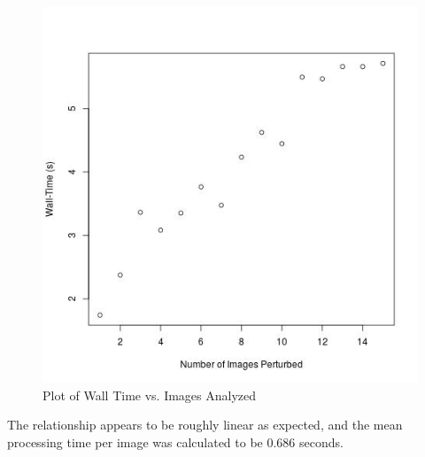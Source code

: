 \documentclass{article}
\begin{document}
\begin{figure}[H]
\centering
\includegraphics[scale = 0.7]{WallTimeConstant.jpg}
    \caption{Plot of Wall Time vs. Images Analyzed}
    \label{fig:my_label}
\end{figure}

The relationship appears to be roughly linear as expected, and the mean processing time per image was calculated to be 0.686 seconds.
\end{document}
